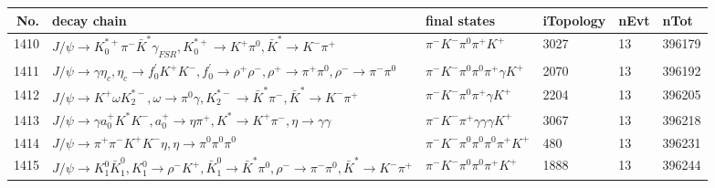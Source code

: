 \begin{table}[htbp] 
\begin{center}
\begin{small}
\begin{tabular}{rlllll}\hline\hline
 No. & decay chain & final states &  iTopology & nEvt & nTot \\\hline
1410&$J/\psi       \rightarrow K_{0}^{*+}     \pi^{-}        \bar{K}^{*}   \gamma_{FSR} , K_{0}^{*+}      \rightarrow K^{+}          \pi^{0}        , \bar{K}^{*}    \rightarrow K^{-}          \pi^{+}        $&$\pi^{-}        K^{-}          \pi^{0}        \pi^{+}        K^{+}          $& 3027&   13&396179\\
1411&$J/\psi       \rightarrow \gamma       \eta_{c}    , \eta_{c}     \rightarrow f^{'}_{0}     K^{+}          K^{-}          , f^{'}_{0}      \rightarrow \rho^{+}      \rho^{-}      , \rho^{+}       \rightarrow \pi^{+}        \pi^{0}        , \rho^{-}       \rightarrow \pi^{-}        \pi^{0}        $&$\pi^{-}        K^{-}          \pi^{0}        \pi^{0}        \pi^{+}        \gamma       K^{+}          $& 2070&   13&396192\\
1412&$J/\psi       \rightarrow K^{+}          \omega         K_2^{*-}       , \omega          \rightarrow \pi^{0}        \gamma       , K_2^{*-}        \rightarrow \bar{K}^{*}   \pi^{-}        , \bar{K}^{*}    \rightarrow K^{-}          \pi^{+}        $&$\pi^{-}        K^{-}          \pi^{0}        \pi^{+}        \gamma       K^{+}          $& 2204&   13&396205\\
1413&$J/\psi       \rightarrow \gamma       a_{0}^{+}      K^{*}          K^{-}          , a_{0}^{+}       \rightarrow \eta          \pi^{+}        , K^{*}           \rightarrow K^{+}          \pi^{-}        , \eta           \rightarrow \gamma       \gamma       $&$\pi^{-}        K^{-}          \pi^{+}        \gamma       \gamma       \gamma       K^{+}          $& 3067&   13&396218\\
1414&$J/\psi       \rightarrow \pi^{+}        \pi^{-}        K^{+}          K^{-}          \eta          , \eta           \rightarrow \pi^{0}        \pi^{0}        \pi^{0}        $&$\pi^{-}        K^{-}          \pi^{0}        \pi^{0}        \pi^{0}        \pi^{+}        K^{+}          $&  480&   13&396231\\
1415&$J/\psi       \rightarrow K_1^{0}        \bar{K}_1^{0} , K_1^{0}         \rightarrow \rho^{-}      K^{+}          , \bar{K}_1^{0}  \rightarrow \bar{K}^{*}   \pi^{0}        , \rho^{-}       \rightarrow \pi^{-}        \pi^{0}        , \bar{K}^{*}    \rightarrow K^{-}          \pi^{+}        $&$\pi^{-}        K^{-}          \pi^{0}        \pi^{0}        \pi^{+}        K^{+}          $& 1888&   13&396244\\

\end{tabular}
\end{small}
\end{center}
\end{table}

